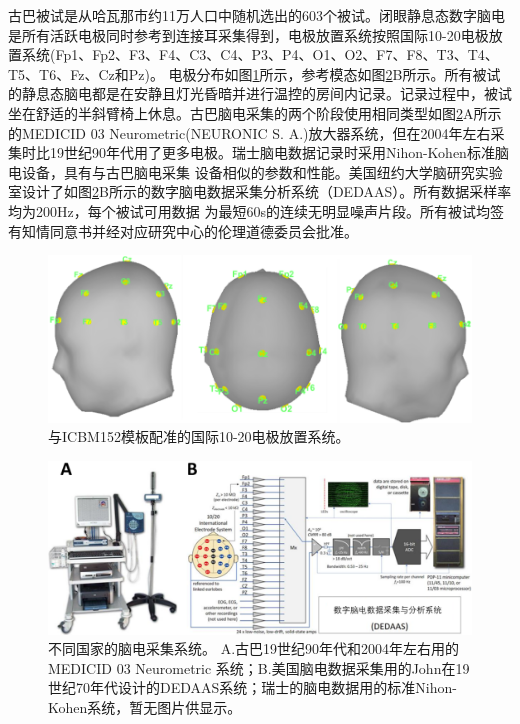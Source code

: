 古巴被试是从哈瓦那市约11万人口中随机选出的603个被试。闭眼静息态数字脑电是所有活跃电极同时参考到连接耳采集得到，电极放置系统按照国际10-20电极放置系统(Fp1、Fp2、F3、F4、C3、C4、P3、P4、O1、O2、F7、F8、T3、T4、T5、T6、Fz、Cz和Pz)。 电极分布如图\ref{6:ele}所示，参考模态如图\ref{6:amp}B所示。所有被试的静息态脑电都是在安静且灯光昏暗并进行温控的房间内记录。记录过程中，被试坐在舒适的半斜臂椅上休息。古巴脑电采集的两个阶段使用相同类型如图\ref{6:amp}A所示的MEDICID 03 Neurometric(NEURONIC S. A.)放大器系统，但在2004年左右采集时比19世纪90年代用了更多电极。瑞士脑电数据记录时采用Nihon-Kohen标准脑电设备，具有与古巴脑电采集
设备相似的参数和性能。美国纽约大学脑研究实验室设计了如图\ref{6:amp}B所示的数字脑电数据采集分析系统（DEDAAS）。所有数据采样率均为200Hz，每个被试可用数据
为最短60s的连续无明显噪声片段。所有被试均签有知情同意书并经对应研究中心的伦理道德委员会批准。
\bigskip
\begin{figure}[!h]
\includegraphics[width=13cm]{pic/Norm/figure2.png}
\caption{与ICBM152模板配准的国际10-20电极放置系统。}
\label{6:ele}
\end{figure}

\begin{figure}[!h]
\includegraphics[width=15cm]{pic/Norm/figure3.png}
\caption{不同国家的脑电采集系统。 A.古巴19世纪90年代和2004年左右用的MEDICID 03 Neurometric 系统；B.美国脑电数据采集用的John在19世纪70年代设计的DEDAAS系统；瑞士的脑电数据用的标准Nihon-Kohen系统，暂无图片供显示。}
\label{6:amp}
\end{figure}

